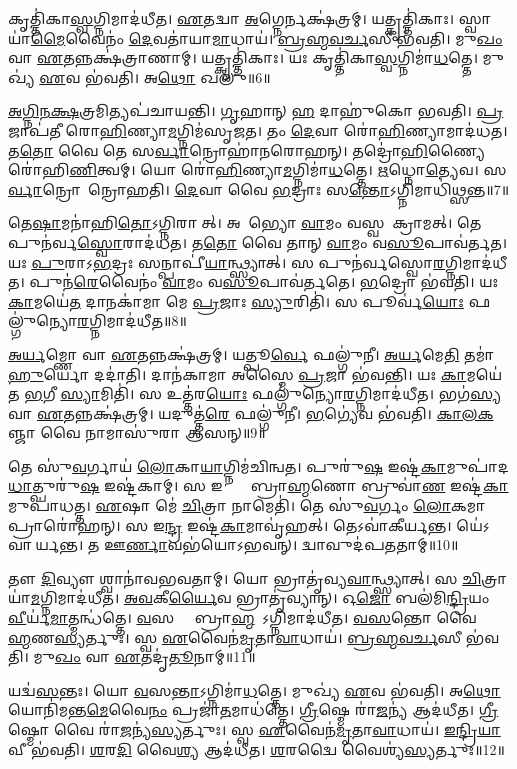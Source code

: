 𑌕𑍃𑌤𑍍𑌤𑌿॑𑌕𑌾\ul{𑌸𑍍𑌵}𑌗𑍍𑌨𑌿𑌮𑌾𑌦॑𑌧𑍀𑌤।
\ul{𑌏}𑌤𑌦𑍍𑌵𑌾 \ul{𑌅}𑌗𑍍𑌨𑍇𑌰𑍍𑌨𑌕𑍍𑌷॑𑌤𑍍𑌰𑌮𑍍।
𑌯𑌤𑍍𑌕𑍃𑌤𑍍𑌤𑌿॑𑌕𑌾𑌃।
𑌸𑍍𑌵𑌾𑌯𑌾॑\ul{𑌮𑍈}𑌵𑍈𑌨𑌂॑ \ul{𑌦𑍇}𑌵𑌤𑌾॑𑌯𑌾\ul{𑌮𑌾}𑌧𑌾𑌯॑।
\ul{𑌬𑍍𑌰}\ul{𑌹𑍍𑌮}\ul{𑌵}\ul{𑌰𑍍𑌚}𑌸𑍀 𑌭॑𑌵𑌤𑌿।
𑌮𑍁\ul{𑌖𑌂} 𑌵𑌾 \ul{𑌏}𑌤𑌨𑍍𑌨𑌕𑍍𑌷॑𑌤𑍍𑌰𑌾𑌣𑌾𑌮𑍍।
𑌯𑌤𑍍𑌕𑍃𑌤𑍍𑌤𑌿॑𑌕𑌾𑌃।
𑌯𑌃 𑌕𑍃𑌤𑍍𑌤𑌿॑𑌕𑌾\ul{𑌸𑍍𑌵}𑌗𑍍𑌨𑌿𑌮𑌾॑\ul{𑌧}𑌤𑍍𑌤𑍇।
𑌮𑍁𑌖𑍍𑌯॑ \ul{𑌏}𑌵 𑌭॑𑌵𑌤𑌿।
𑌅\ul{𑌥𑍋} 𑌖𑌲𑍁॑॥6॥

\ul{𑌅}\ul{𑌗𑍍𑌨𑌿}\ul{𑌨}\ul{𑌕𑍍𑌷}𑌤𑍍𑌰𑌮𑌿𑌤𑍍𑌯𑌪॑𑌚𑌾𑌯𑌨𑍍𑌤𑌿।
\ul{𑌗𑍃}𑌹𑌾𑌨𑍍 \ul{𑌹} 𑌦𑌾𑌹𑍁॑𑌕𑍋 𑌭𑌵𑌤𑌿।
\ul{𑌪𑍍𑌰}𑌜𑌾𑌪॑𑌤𑍀 𑌰𑍋\ul{𑌹𑌿}𑌣𑍍𑌯𑌾\ul{𑌮}𑌗𑍍𑌨𑌿𑌮॑𑌸𑍃𑌜𑌤।
𑌤𑌂 \ul{𑌦𑍇}𑌵𑌾 𑌰𑍋॑\ul{𑌹𑌿}𑌣𑍍𑌯𑌾𑌮𑌾𑌦॑𑌧𑌤।
𑌤\ul{𑌤𑍋} 𑌵𑍈 𑌤𑍇 𑌸\ul{𑌰𑍍𑌵𑌾}𑌨𑍍𑌰𑍋𑌹𑌾॑𑌨𑌰𑍋𑌹𑌨𑍍।
𑌤𑌦𑍍𑌰𑍋॑\ul{𑌹𑌿}𑌣𑍍𑌯𑍈 𑌰𑍋॑𑌹𑌿\ul{𑌣𑌿}𑌤𑍍𑌵𑌮𑍍।
𑌯𑍋 𑌰𑍋॑\ul{𑌹𑌿}𑌣𑍍𑌯𑌾\ul{𑌮}𑌗𑍍𑌨𑌿𑌮𑌾॑\ul{𑌧}𑌤𑍍𑌤𑍇।
\ul{𑌋}𑌧𑍍𑌨𑍋\ul{𑌤𑍍𑌯𑍇}𑌵।
𑌸\ul{𑌰𑍍𑌵𑌾}𑌨𑍍𑌰𑍋𑌹𑌾᳚𑌨𑍍𑌰𑍋𑌹𑌤𑌿।
\ul{𑌦𑍇}𑌵𑌾 𑌵𑍈 \ul{𑌭}𑌦𑍍𑌰𑌾𑌃 𑌸\ul{𑌨𑍍𑌤𑍋}\-𑌽𑌗𑍍𑌨𑌿𑌮𑌾𑌧𑌿॑𑌥𑍍𑌸𑌨𑍍𑌤॥7॥

𑌤𑍇\ul{𑌷𑌾}𑌮𑌨𑌾॑𑌹𑌿\ul{𑌤𑍋}\-𑌽𑌗𑍍𑌨𑌿𑌰𑌾𑌸𑍀᳚𑌤𑍍।
𑌅𑌥𑍈᳚𑌭𑍍𑌯𑍋 \ul{𑌵𑌾}𑌮𑌂 𑌵𑌸𑍍𑌵𑌪𑌾᳚𑌕𑍍𑌰𑌾𑌮𑌤𑍍।
𑌤𑍇 𑌪𑍁𑌨॑𑌰𑍍𑌵\ul{𑌸𑍍𑌵𑍋}𑌰𑌾𑌦॑𑌧𑌤।
𑌤\ul{𑌤𑍋} 𑌵𑍈 𑌤𑌾𑌨𑍍 \ul{𑌵𑌾}𑌮𑌂 𑌵\ul{𑌸𑍂}𑌪𑌾𑌵॑𑌰𑍍𑌤𑌤।
𑌯𑌃 \ul{𑌪𑍁}𑌰𑌾𑌽\ul{𑌭}𑌦𑍍𑌰𑌃 𑌸𑌨𑍍𑌪𑌾𑌪𑍀॑\ul{𑌯𑌾}𑌨𑍍𑌥𑍍𑌸𑍍𑌯𑌾𑌤𑍍।
𑌸 𑌪𑍁𑌨॑𑌰𑍍𑌵𑌸𑍍𑌵𑍋\ul{𑌰}𑌗𑍍𑌨𑌿𑌮𑌾𑌦॑𑌧𑍀𑌤।
𑌪𑍁𑌨॑\ul{𑌰𑍇}𑌵𑍈𑌨𑌂॑ \ul{𑌵𑌾}𑌮𑌂 𑌵\ul{𑌸𑍂}𑌪𑌾𑌵॑𑌰𑍍𑌤𑌤𑍇।
\ul{𑌭}𑌦𑍍𑌰𑍋 𑌭॑𑌵𑌤𑌿।
𑌯𑌃 \ul{𑌕𑌾}𑌮𑌯𑍇॑\ul{𑌤} 𑌦𑌾𑌨𑌕𑌾॑𑌮𑌾 𑌮𑍇 \ul{𑌪𑍍𑌰}𑌜𑌾𑌃 \ul{𑌸𑍍𑌯𑍁}𑌰𑌿𑌤𑌿॑।
𑌸 𑌪𑍂𑌰𑍍𑌵॑\ul{𑌯𑍋𑌃} 𑌫𑌲𑍍𑌗𑍁॑𑌨𑍍𑌯𑍋\ul{𑌰}𑌗𑍍𑌨𑌿𑌮𑌾𑌦॑𑌧𑍀𑌤॥8॥

\ul{𑌅}\ul{𑌰𑍍𑌯}𑌮𑍍𑌣𑍋 𑌵𑌾 \ul{𑌏}𑌤𑌨𑍍𑌨𑌕𑍍𑌷॑𑌤𑍍𑌰𑌮𑍍।
𑌯𑌤𑍍𑌪𑍂\ul{𑌰𑍍𑌵𑍇} 𑌫𑌲𑍍𑌗𑍁॑𑌨𑍀।
\ul{𑌅}\ul{𑌰𑍍𑌯}𑌮𑍇\ul{𑌤𑌿} 𑌤𑌮𑌾॑\ul{𑌹𑍁}𑌰𑍍𑌯𑍋 𑌦𑌦𑌾॑𑌤𑌿।
𑌦𑌾𑌨॑𑌕𑌾𑌮𑌾 𑌅𑌸𑍍𑌮𑍈 \ul{𑌪𑍍𑌰}𑌜𑌾 𑌭॑𑌵𑌨𑍍𑌤𑌿।
𑌯𑌃 \ul{𑌕𑌾}𑌮𑌯𑍇॑𑌤 \ul{𑌭}𑌗𑍀 \ul{𑌸𑍍𑌯𑌾}𑌮𑌿𑌤𑌿॑।
𑌸 𑌉𑌤𑍍𑌤॑𑌰\ul{𑌯𑍋𑌃} 𑌫𑌲𑍍𑌗𑍁॑𑌨𑍍𑌯𑍋\ul{𑌰}𑌗𑍍𑌨𑌿𑌮𑌾𑌦॑𑌧𑍀𑌤।
𑌭𑌗॑\ul{𑌸𑍍𑌯} 𑌵𑌾 \ul{𑌏}𑌤𑌨𑍍𑌨𑌕𑍍𑌷॑𑌤𑍍𑌰𑌮𑍍।
𑌯𑌦𑍁𑌤𑍍𑌤॑\ul{𑌰𑍇} 𑌫𑌲𑍍𑌗𑍁॑𑌨𑍀।
\ul{𑌭}𑌗𑍍𑌯𑍇॑𑌵 𑌭॑𑌵𑌤𑌿।
\ul{𑌕𑌾}\ul{𑌲}\ul{𑌕}𑌞𑍍𑌜𑌾 𑌵𑍈 𑌨𑌾𑌮𑌾𑌸𑍁॑𑌰𑌾 𑌆𑌸𑌨𑍍॥9॥

𑌤𑍇 𑌸𑍁॑\ul{𑌵}𑌰𑍍𑌗𑌾𑌯॑ \ul{𑌲𑍋}𑌕𑌾\ul{𑌯𑌾}𑌗𑍍𑌨𑌿𑌮॑𑌚𑌿𑌨𑍍𑌵𑌤।
𑌪𑍁𑌰𑍁॑\ul{𑌷} 𑌇𑌷𑍍𑌟॑\ul{𑌕𑌾}𑌮𑍁𑌪𑌾॑𑌦\ul{𑌧𑌾}𑌤𑍍\-𑌪𑍁𑌰𑍁॑\ul{𑌷} 𑌇𑌷𑍍𑌟॑𑌕𑌾𑌮𑍍।
𑌸 𑌇𑌨𑍍𑌦𑍍𑌰𑍋᳚ 𑌬𑍍𑌰𑌾\ul{𑌹𑍍𑌮}𑌣𑍋 𑌬𑍍𑌰𑍁𑌵𑌾॑\ul{𑌣} 𑌇𑌷𑍍𑌟॑\ul{𑌕𑌾}𑌮𑍁𑌪𑌾॑𑌧𑌤𑍍𑌤।
\ul{𑌏}𑌷𑌾 𑌮𑍇॑ \ul{𑌚𑌿}𑌤𑍍𑌰𑌾 𑌨𑌾𑌮𑍇𑌤𑌿॑।
𑌤𑍇 𑌸𑍁॑\ul{𑌵}𑌰𑍍𑌗𑌂 \ul{𑌲𑍋}𑌕𑌮𑌾 𑌪𑍍𑌰𑌾𑌰𑍋॑𑌹𑌨𑍍।
𑌸 𑌇\ul{𑌨𑍍𑌦𑍍𑌰} 𑌇𑌷𑍍𑌟॑\ul{𑌕𑌾}𑌮𑌾𑌵𑍃॑𑌹𑌤𑍍।
𑌤𑍇𑌽𑌵𑌾॑𑌕𑍀𑌰𑍍𑌯𑌨𑍍𑌤।
𑌯𑍇॑𑌽𑌵𑌾𑌕𑍀᳚𑌰𑍍𑌯𑌨𑍍𑌤।
𑌤 𑌊\ul{𑌰𑍍𑌣𑌾}𑌵𑌭॑𑌯𑍋\-𑌽𑌭𑌵𑌨𑍍।
𑌦𑍍𑌵𑌾𑌵𑍁𑌦॑𑌪𑌤𑌤𑌾𑌮𑍍॥10॥

𑌤𑍗 \ul{𑌦𑌿}𑌵𑍍𑌯𑍗 𑌶𑍍𑌵𑌾𑌨𑌾॑𑌵𑌭𑌵𑌤𑌾𑌮𑍍।
𑌯𑍋 𑌭𑍍𑌰𑌾𑌤𑍃॑𑌵𑍍𑌯\ul{𑌵𑌾}𑌨𑍍𑌥𑍍𑌸𑍍𑌯𑌾𑌤𑍍।
𑌸 \ul{𑌚𑌿}𑌤𑍍𑌰𑌾𑌯𑌾॑\ul{𑌮}𑌗𑍍𑌨𑌿𑌮𑌾𑌦॑𑌧𑍀𑌤।
\ul{𑌅}\ul{𑌵}𑌕𑍀\ul{𑌰𑍍𑌯𑍈}𑌵 𑌭𑍍𑌰𑌾𑌤𑍃॑𑌵𑍍𑌯𑌾𑌨𑍍।
𑌓\ul{𑌜𑍋} 𑌬𑌲॑𑌮𑌿\ul{𑌨𑍍𑌦𑍍𑌰𑌿}𑌯𑌂 \ul{𑌵𑍀}𑌰𑍍𑌯॑\ul{𑌮𑌾}𑌤𑍍𑌮𑌨𑍍𑌧॑𑌤𑍍𑌤𑍇।
\ul{𑌵}𑌸𑌨𑍍𑌤𑌾᳚ 𑌬𑍍𑌰𑌾\ul{𑌹𑍍𑌮}𑌣𑍋᳚\-𑌽𑌗𑍍𑌨𑌿𑌮𑌾𑌦॑𑌧𑍀𑌤।
\ul{𑌵}\ul{𑌸}𑌨𑍍𑌤𑍋 𑌵𑍈 𑌬𑍍𑌰𑌾᳚\ul{𑌹𑍍𑌮}𑌣\ul{𑌸𑍍𑌯}𑌰𑍍𑌤𑍁𑌃।
𑌸𑍍𑌵 \ul{𑌏}𑌵𑍈𑌨॑\ul{𑌮𑍃}𑌤𑌾\ul{𑌵𑌾}𑌧𑌾𑌯॑।
\ul{𑌬𑍍𑌰}\ul{𑌹𑍍𑌮}\ul{𑌵}\ul{𑌰𑍍𑌚}𑌸𑍀 𑌭॑𑌵𑌤𑌿।
𑌮𑍁\ul{𑌖𑌂} 𑌵𑌾 \ul{𑌏}𑌤𑌦𑍃॑\ul{𑌤𑍂}𑌨𑌾𑌮𑍍॥11॥

𑌯𑌦𑍍𑌵॑\ul{𑌸}𑌨𑍍𑌤𑌃।
𑌯𑍋 \ul{𑌵}𑌸\ul{𑌨𑍍𑌤𑌾}\-𑌽𑌗𑍍𑌨𑌿𑌮𑌾॑\ul{𑌧}𑌤𑍍𑌤𑍇।
𑌮𑍁𑌖𑍍𑌯॑ \ul{𑌏}𑌵 𑌭॑𑌵𑌤𑌿।
𑌅\ul{𑌥𑍋} 𑌯𑍋𑌨𑌿॑𑌮𑌨𑍍𑌤\ul{𑌮𑍇}𑌵𑍈\ul{𑌨𑌂} 𑌪𑍍𑌰𑌜𑌾॑\ul{𑌤}𑌮𑌾𑌧॑𑌤𑍍𑌤𑍇।
\ul{𑌗𑍍𑌰𑍀}𑌷𑍍𑌮𑍇 𑌰𑌾॑\ul{𑌜}𑌨𑍍𑌯॑ 𑌆𑌦॑𑌧𑍀𑌤।
\ul{𑌗𑍍𑌰𑍀}𑌷𑍍𑌮𑍋 𑌵𑍈 𑌰𑌾॑\ul{𑌜}𑌨𑍍𑌯॑\ul{𑌸𑍍𑌯}𑌰𑍍𑌤𑍁𑌃।
𑌸𑍍𑌵 \ul{𑌏}𑌵𑍈𑌨॑\ul{𑌮𑍃}𑌤𑌾\ul{𑌵𑌾}𑌧𑌾𑌯॑।
\ul{𑌇}\ul{𑌨𑍍𑌦𑍍𑌰𑌿}\ul{𑌯𑌾}𑌵𑍀 𑌭॑𑌵𑌤𑌿।
\ul{𑌶}𑌰\ul{𑌦𑌿} 𑌵𑍈\ul{𑌶𑍍𑌯} 𑌆𑌦॑𑌧𑍀𑌤।
\ul{𑌶}𑌰𑌦𑍍𑌵𑍈 𑌵𑍈𑌶𑍍𑌯॑\ul{𑌸𑍍𑌯}𑌰𑍍𑌤𑍁𑌃॥12॥

